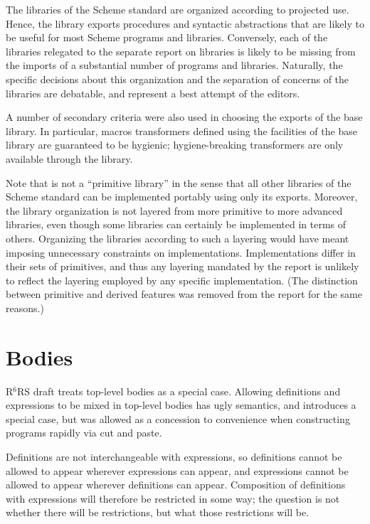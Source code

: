 \documentclass[twoside,twocolumn]{algol60}
\newcommand{\rn}[1]{R$^{#1}$RS}
\begin{document}
The libraries of the Scheme standard are organized according to
projected use.  Hence, the  library exports
procedures and syntactic abstractions that are likely to be useful for
most Scheme programs and libraries.  Conversely, each of the libraries
relegated to the separate report on libraries is likely to be missing
from the imports of a substantial number of programs and libraries.
Naturally, the specific decisions about this organization and the
separation of concerns of the libraries are debatable, and represent a
best attempt of the editors.

A number of secondary criteria were also used in choosing the exports
of the base library.  In particular, macros transformers defined using
the facilities of the base library are guaranteed to be hygienic;
hygiene-breaking transformers are only available through the
 library.

Note that  is not a ``primitive library'' in the
sense that all other libraries of the Scheme standard can be
implemented portably using only its exports.  Moreover, the library
organization is not layered from more primitive to more advanced
libraries, even though some libraries can certainly be implemented in
terms of others.  Organizing the libraries according to such a
layering would have meant imposing unnecessary constraints on
implementations.  Implementations differ in their sets of primitives,
and thus any layering mandated by the report is unlikely to reflect
the layering employed by any specific implementation.  (The
distinction between primitive and derived features was removed from
the report for the same reasons.)

\section{Bodies}

\rn{6} draft treats top-level bodies as a special case.  Allowing
definitions and expressions to be mixed in top-level bodies has ugly
semantics, and introduces a special case, but was allowed as a
concession to convenience when constructing programs rapidly via cut
and paste.

Definitions are not interchangeable with expressions, so definitions
cannot be allowed to appear wherever expressions can appear, and
expressions cannot be allowed to appear wherever definitions can
appear.  Composition of definitions with expressions will therefore be
restricted in some way; the question is not whether there will be
restrictions, but what those restrictions will be.
\end{document}
